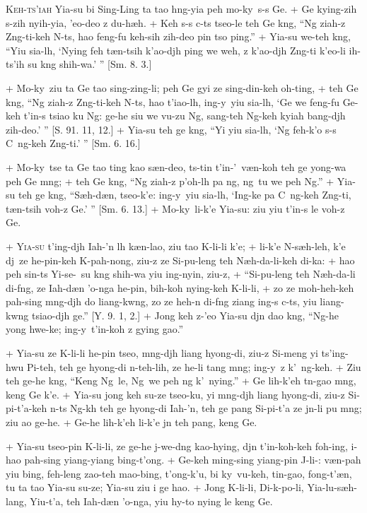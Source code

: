 \header
\lettrine{K}{eh-ts'iah} Yia-su bi Sing-Ling ta tao h\oo ng-yia peh mo-ky\y\ s-s Ge.
+	Ge kying-zih s-zih nyih-yia, 'eo-deo z du-h\ae h.
+	Keh s-s c\y-ts tseo-le teh Ge k\oo ng, ``Ng ziah-z Z\oo ng-ti-keh N-ts, hao feng-fu keh-sih zih-deo pin tso ping.''
+	Yia-su we-teh k\oo ng, ``Yiu sia-l\oo h, `Nying feh t\ae n-tsih k'ao-dj\oo h ping we weh, z k'ao-dj\oo h Z\oo ng-ti k'eo-li ih-ts'ih su k\oo ng shih-wa.' '' [Sm. 8. 3.]
\par
+	Mo-ky\y\ ziu ta Ge tao sing-zing-li; peh Ge gyi ze sing-din-keh oh-ting,
+	teh Ge k\oo ng, ``Ng ziah-z Z\oo ng-ti-keh N-ts, hao t'iao-l\oo h, ing-y\y{}iu sia-l\oo h, `Ge we feng-fu Ge-keh t'in-s tsiao ku Ng: ge-he siu we vu-zu Ng, sang-teh Ng-keh kyiah bang-dj\oo h zih-deo.' '' [S. 91. 11, 12.]
+	Yia-su teh ge k\oo ng, ``Yi yiu sia-l\oo h, `Ng feh-k'o s-s C\y\ ng-keh Z\oo ng-ti.' '' [Sm. 6. 16.]
\par
+	Mo-ky\y\ tse ta Ge tao ting kao s\ae n-deo, ts-tin t'in-'\oo\ v\ae n-koh teh ge y\y ong-wa peh Ge m\oo ng;
+	teh Ge k\oo ng, ``Ng ziah-z p'oh-l\oo h pa ng\oo, ng\oo\ tu we peh Ng.''
+	Yia-su teh ge k\oo ng, ``S\ae h-d\ae n, tseo-k'e: ing-y\y{}iu sia-l\oo h, `Ing-ke pa C\y\ ng-keh Z\oo ng-ti, t\ae n-tsih voh-z Ge.' '' [Sm. 6. 13.]
+	Mo-ky\y\ li-k'e Yia-su: ziu yiu t'in-s le voh-z Ge.
\par
+	\textsc{Yia-su} t'ing-dj\oo h Iah-'\e n l\oo h k\ae n-lao, ziu tao K\oo-li-li k'e;
+	li-k'e N\oo-s\ae h-leh, k'e dj\y\ ze he-pin-keh K\oo-pah-nong, ziu-z ze Si-pu-leng teh N\ae h-da-li-keh di-ka:
+	hao peh sin-ts Yi-se-\oo\ su k\oo ng shih-wa yiu ing-nyin, ziu-z,
+	``Si-pu-leng teh N\ae h-da-li di-f\oo ng, ze Iah-d\ae n 'o-nga he-pin, bih-koh nying-keh K\oo-li-li,
+	zo ze moh-heh-keh pah-sing m\oo ng-dj\oo h do liang-kw\oo ng, zo ze heh-\e n di-f\oo ng ziang ing-s c\y-ts, yiu liang-kw\oo ng tsiao-dj\oo h ge.'' [Y. 9. 1, 2.]
+	Jong keh z-'eo Yia-su dj\y n dao k\oo ng, ``Ng-he y\y ong hwe-ke; ing-y\y\ t'in-koh z gying gao.''
\par
+	Yia-su ze K\oo-li-li he-pin tseo, m\oo ng-dj\oo h liang hy\y ong-di, ziu-z Si-meng yi ts'ing-hwu Pi-teh, teh ge hy\y ong-di \E n-teh-lih, ze he-li tang m\oo ng; ing-y\y\ z k'\oo\ ng-keh.
+	Ziu teh ge-he k\oo ng, ``Keng Ng\oo\ le, Ng\oo\ we peh ng k'\oo\ nying.''
+	Ge lih-k'eh t\e n-gao m\oo ng, keng Ge k'e.
+	Yia-su jong keh su-ze tseo-ku, yi m\oo ng-dj\oo h liang hy\y ong-di, ziu-z Si-pi-t'a-keh n-ts Ng\oo-k\oo h teh ge hy\y ong-di Iah-'\e n, teh ge pang Si-pi-t'a ze j\y n-li pu m\oo ng; ziu ao ge-he.
+	Ge-he lih-k'eh li-k'e j\y n teh pang, keng Ge.
\par
+	Yia-su tseo-pin K\oo-li-li, ze ge-he j\y-we-d\oo ng kao-hy\y ing, dj\y n t'in-koh-keh foh-ing, i-hao pah-sing yiang-yiang bing-t'ong.
+	Ge-keh ming-sing yiang-pin J\y-li-\oo: v\ae n-pah yiu bing, feh-leng zao-teh mao-bing, t'ong-k'u, bi ky\y\ vu-keh, tin-gao, fong-t'\ae n, tu ta tao Yia-su su-ze; Yia-su ziu i ge hao.
+	Jong K\oo-li-li, Di-k\oo-po-li, Yia-lu-s\ae h-lang, Yiu-t'a, teh Iah-d\ae n 'o-nga, yiu hy\y-to nying le keng Ge.



